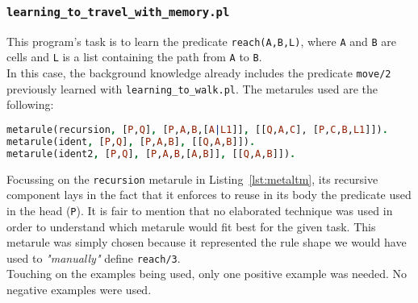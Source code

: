 \subsubsection{\texttt{learning\_to\_travel\_with\_memory.pl}}
This program's task is to learn the predicate \texttt{reach(A,B,L)}, where \texttt{A} and \texttt{B} are cells and
\texttt{L} is a list containing the path from \texttt{A} to \texttt{B}.\\
In this case, the background knowledge already includes the predicate \texttt{move/2} previously learned with \texttt{learning\_to\_walk.pl}.
The metarules used are the following:
\begin{lstlisting}[label={lst:metaltm}, language=Prolog, caption=Metarules in \texttt{learning\_to\_travel\_with\_memory.pl}, belowcaptionskip=1cm]
metarule(recursion, [P,Q], [P,A,B,[A|L1]], [[Q,A,C], [P,C,B,L1]]).
metarule(ident, [P,Q], [P,A,B], [[Q,A,B]]).
metarule(ident2, [P,Q], [P,A,B,[A,B]], [[Q,A,B]]).
\end{lstlisting}
Focussing on the \texttt{recursion} metarule in Listing~\ref{lst:metaltm}, its recursive component lays in the fact that it enforces to reuse in its body the predicate used
in the head (\texttt{P}). It is fair to mention that no elaborated technique was used in order to understand which metarule would fit best for the given task. This metarule
was simply chosen because it represented the rule shape we would have used to \emph{"manually"} define \texttt{reach/3}.\\

Touching on the examples being used, only one positive example was needed. No negative examples were used.
\newpage